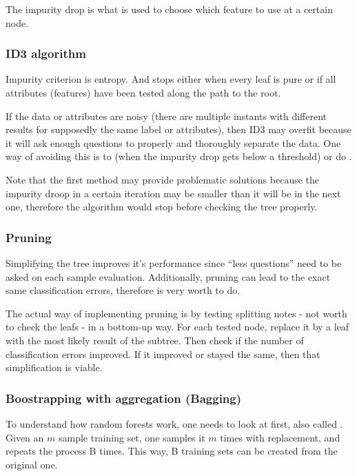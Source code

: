 
The impurity drop is what is used to choose which feature to use at a certain node.


\subsubsection{ID3 algorithm}

Impurity criterion is entropy. And stops either when every leaf is pure or if all attributes (features) have been tested along the path to the root.

If the data or attributes are noisy (there are multiple instants with different results for supposedly the same label or attributes), then ID3 may overfit because it will ask enough questions to properly and thoroughly separate the data. One way of avoiding this is to  (when the impurity drop gets below a threshold) or do .

Note that the first method may provide problematic solutions because the impurity droop in a certain iteration may be smaller than it will be in the next one, therefore the algorithm would stop before checking the tree properly.

\subsubsection{Pruning}

Simplifying the tree improves it's performance since ``less questions'' need to be asked on each sample evaluation. Additionally, pruning can lead to the exact same classification errors, therefore is very worth to do.

The actual way of implementing pruning is by testing splitting notes - not worth to check the leafs - in a bottom-up way. For each tested node, replace it by a leaf with the most likely result of the subtree. Then check if the number of classification errors improved. If it improved or stayed the same, then that simplification is viable.

\subsubsection{Boostrapping with aggregation (Bagging)} 
To understand how random forests work, one needs to look at  first, also called . 
Given an $m$ sample training set, one samples it $m$ times with replacement, and repeats the process B times. This way, B training sets can be created from the original one. 

